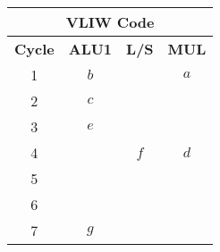 \begin{examplebox}
    \begin{center}
        \begin{tabular}{@{} c | c | c | c @{}}
            \toprule
            \multicolumn{4}{c}{VLIW Code} \\
            \midrule
            \textbf{Cycle} & \textbf{ALU1} & \textbf{L/S} & \textbf{MUL} \\
            \midrule
            1 & $b$   &   & $a$ \\
            2 & $c$   &   &   \\
            3 & $e$   &   &   \\
            4 &     & $f$ & $d$ \\
            5 &     &   &   \\
            6 &     &   &   \\
            7 & $g$   &   &   \\
            \bottomrule
        \end{tabular}
    \end{center}
\end{examplebox}